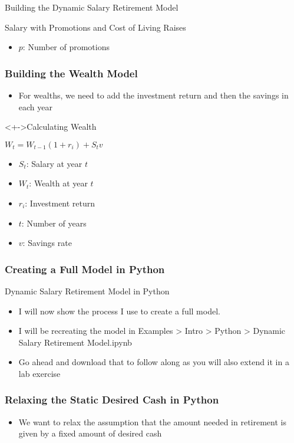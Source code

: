 \documentclass[handout, 11pt]{beamer}
\begin{document}
\begin{section}{Building the Dynamic Salary Retirement Model}
\begin{frame}
\begin{block}{Salary with Promotions and Cost of Living Raises}
\begin{itemize}
\item $p$:  Number of promotions
\end{itemize}
\end{block}
\end{frame}
\begin{frame}
\frametitle{Building the Wealth Model}
\begin{itemize}[<+->]
\item For wealths, we need to add the investment return and then the savings in each year
\end{itemize}
\vfill
\begin{block}<+->{Calculating Wealth}
\begin{center}
\begin{adjustbox}{width=0.9\textwidth, height=0.8\textheight, keepaspectratio}
$W_t = W_{t-1}  (1 + r_i) + S_t  v$
\end{adjustbox}
\end{center}
\begin{itemize}
\item $S_t$:  Salary at year $t$
\item $W_t$:  Wealth at year $t$
\item $r_i$:  Investment return
\item $t$:  Number of years
\item $v$:  Savings rate
\end{itemize}
\end{block}
\end{frame}
\begin{frame}
\frametitle{Creating a Full Model in Python}
{
\begin{block}{Dynamic Salary Retirement Model in Python}
\begin{itemize}
\item I will now show the process I use to create a full model.
\item I will be recreating the model in Examples > Intro > Python > Dynamic Salary Retirement Model.ipynb
\item Go ahead and download that to follow along as you will also extend it in a lab exercise
\end{itemize}
\end{block}
}
\end{frame}
\begin{frame}
\frametitle{Relaxing the Static Desired Cash in Python}
\begin{itemize}
\item We want to relax the assumption that the amount needed in retirement is given by a fixed amount of desired cash

\end{itemize}
\end{frame}
\end{section}
\end{document}
